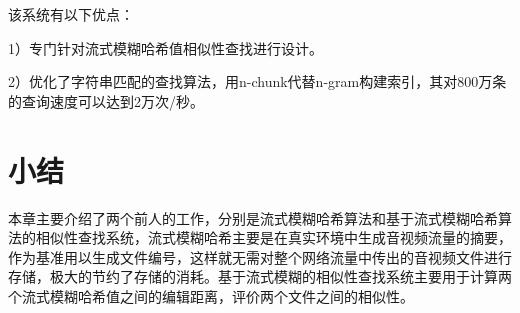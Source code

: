 该系统有以下优点：

1）专门针对流式模糊哈希值相似性查找进行设计。

2）优化了字符串匹配的查找算法，用n-chunk代替n-gram构建索引，其对800万条的查询速度可以达到2万次/秒。

\section{小结}
本章主要介绍了两个前人的工作，分别是流式模糊哈希算法和基于流式模糊哈希算法的相似性查找系统，流式模糊哈希主要是在真实环境中生成音视频流量的摘要，作为基准用以生成文件编号，这样就无需对整个网络流量中传出的音视频文件进行存储，极大的节约了存储的消耗。基于流式模糊的相似性查找系统主要用于计算两个流式模糊哈希值之间的编辑距离，评价两个文件之间的相似性。


